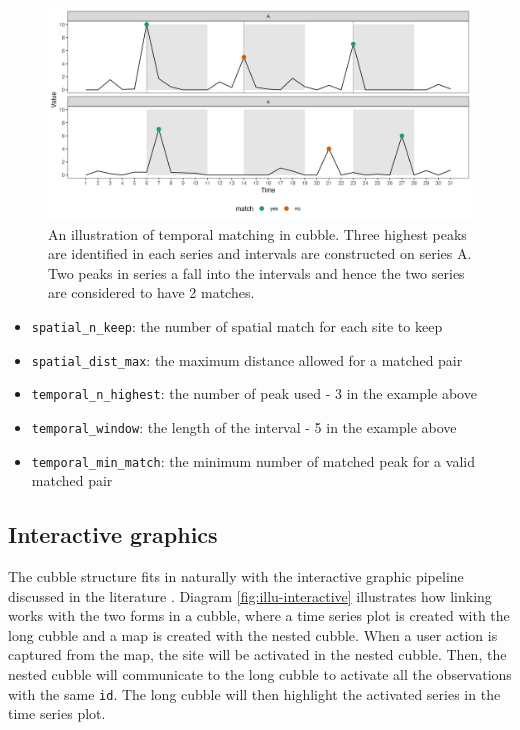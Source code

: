 \documentclass[
]{jss}
\providecommand{\tightlist}{%
  \setlength{\itemsep}{0pt}\setlength{\parskip}{0pt}}
\begin{document}
\begin{CodeChunk}
\begin{figure}

{\centering \includegraphics[width=1\linewidth]{figures/illu-matching} 

}

\caption[An illustration of temporal matching in cubble]{An illustration of temporal matching in cubble. Three highest peaks are identified in each series and intervals are constructed on series A. Two peaks in series a fall into the intervals and hence the two series are considered to have 2 matches.}\label{fig:illu-matching}
\end{figure}
\end{CodeChunk}

\begin{itemize}
\tightlist
\item
  \texttt{spatial\_n\_keep}: the number of spatial match for each site
  to keep
\item
  \texttt{spatial\_dist\_max}: the maximum distance allowed for a
  matched pair
\item
  \texttt{temporal\_n\_highest}: the number of peak used - 3 in the
  example above
\item
  \texttt{temporal\_window}: the length of the interval - 5 in the
  example above
\item
  \texttt{temporal\_min\_match}: the minimum number of matched peak for
  a valid matched pair
\end{itemize}

\hypertarget{interactive-graphics}{%
\subsection{Interactive graphics}\label{interactive-graphics}}

The cubble structure fits in naturally with the interactive graphic
pipeline discussed in the literature
\citep{buja1988elements, buja1996interactive, sutherland2000orca, xie2014reactive, cheng2016enabling}.
Diagram \ref{fig:illu-interactive} illustrates how linking works with
the two forms in a cubble, where a time series plot is created with the
long cubble and a map is created with the nested cubble. When a user
action is captured from the map, the site will be activated in the
nested cubble. Then, the nested cubble will communicate to the long
cubble to activate all the observations with the same \texttt{id}. The
long cubble will then highlight the activated series in the time series
plot.
\end{document}
